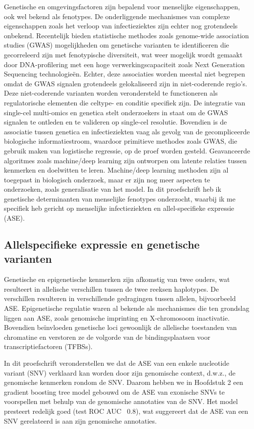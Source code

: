 \documentclass{book}
\begin{document}
\begin{refsection}
Genetische en omgevingsfactoren zijn bepalend voor menselijke eigenschappen, ook wel bekend als fenotypes.
De onderliggende mechanismes van complexe eigenschappen zoals het verloop van infectieziektes zijn echter nog grotendeels onbekend.
Recentelijk bieden statistische methodes zoals genome-wide association studies (GWAS) mogelijkheden om genetische varianten te identificeren die gecorreleerd zijn met fenotypische diversiteit, wat weer mogelijk wordt gemaakt door DNA-profilering met een hoge verwerkingscapaciteit zoals Next Generation Sequencing technologieën.
Echter, deze associaties worden meestal niet begrepen omdat de GWAS signalen grotendeels gelokaliseerd zijn in niet-coderende regio's.
Deze niet-coderende varianten worden verondersteld te functioneren als regulatorische elementen die celtype- en conditie specifiek zijn.
De integratie van single-cel multi-omics en genetica stelt onderzoekers in staat om de GWAS signalen te ontleden en te valideren op single-cel resolutie.
Bovendien is de associatie tussen genetica en infectieziekten vaag als gevolg van de gecompliceerde biologische informatiestroom, waardoor primitieve methodes zoals GWAS, die gebruik maken van logistische regressie, op de proef worden gesteld.
Geavanceerde algoritmes zoals machine/deep learning zijn ontworpen om latente relaties tussen kenmerken en doelwitten te leren.
Machine/deep learning methoden zijn al toegepast in biologisch onderzoek, maar er zijn nog meer aspecten te onderzoeken, zoals generalisatie van het model.
In dit proefschrift heb ik genetische determinanten van menselijke fenotypes onderzocht, waarbij ik me specifiek heb gericht op menselijke infectieziekten en allel-specifieke expressie (ASE).

\subsection*{Allelspecifieke expressie en genetische varianten}
Genetische en epigenetische kenmerken zijn afkomstig van twee ouders, wat resulteert in allelische verschillen tussen de twee reeksen haplotypes.
De verschillen resulteren in verschillende gedragingen tussen allelen, bijvoorbeeld ASE.
Epigenetische regulatie waren al bekende als mechanismes die ten grondslag liggen aan ASE, zoals genomische imprinting en X-chromosoom inactivatie.
Bovendien beïnvloeden genetische loci gewoonlijk de allelische toestanden van chromatine en verstoren ze de volgorde van de bindingsplaatsen voor transcriptiefactoren (TFBSs).

In dit proefschrift veronderstellen we dat de ASE van een enkele nucleotide variant (SNV) verklaard kan worden door zijn genomische context, d.w.z., de genomische kenmerken rondom de SNV.
Daarom hebben we in Hoofdstuk 2 een gradient boosting tree model gebouwd om de ASE van exonische SNVs te voorspellen met behulp van de genomische annotaties van de SNV.
Het model presteert redelijk goed (test ROC AUC ~0.8), wat suggereert dat de ASE van een SNV gerelateerd is aan zijn genomische annotaties.


\end{refsection}
\end{document}

